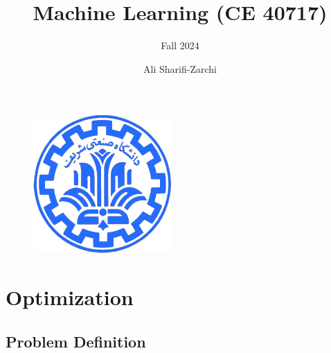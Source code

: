 \documentclass[serif, aspectratio=169]{beamer}
\author{Ali Sharifi-Zarchi}
\title{Machine Learning (CE 40717)}
\subtitle{Fall 2024}
\institute{
    CE Department \\
    Sharif University of Technology
}
\begin{document}
\begin{frame}
    \titlepage
    \vspace*{-0.6cm}
    \begin{figure}[htpb]
        \begin{center}
            \includegraphics[keepaspectratio, scale=0.25]{pic/sharif-main-logo.png}
        \end{center}
    \end{figure}
\end{frame}

\begin{frame}    
\tableofcontents[sectionstyle=show,
subsectionstyle=show/shaded/hide,
subsubsectionstyle=show/shaded/hide]
\end{frame}

\section{Optimization}
\subsection{Problem Definition}
\end{document}

